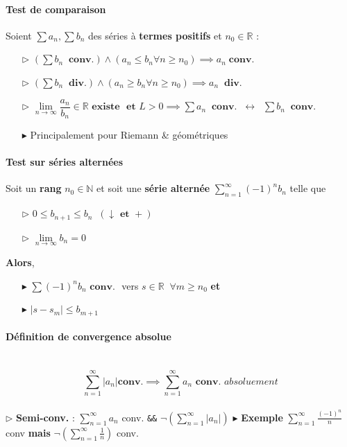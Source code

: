 \documentclass{report}
\begin{document}
\begin{multicols*}{3}
    
     \paragraph{Test de comparaison}
     Soient $\sum a_n, \sum b_n$ des séries à \textbf{termes positifs} 
     et $n_0 \in \mathbb{R}$ :
     \begin{itemize}
         \item[$\rhd$ ] $\left(\sum   b_n  \;\; \textbf{conv.}\right) \land 
             (a_n \leq b_n \forall n \geq n_0) 
             \implies a_n \; \textbf{conv.}$ 
         \item[$\rhd$ ] $\left(\sum   b_n  \;\; \textbf{div.}\right) \land 
             (a_n \geq b_n \forall n \geq n_0) 
             \implies a_n \;\; \textbf{div.}$ 
         \item[$\rhd$ ] $\lim\limits_{n\to\infty}\dfrac{a_n}{b_n}
             \in \mathbb{R} \textbf{ existe } \textbf{ et } L > 0 
             \implies 
        \sum a_n \;\; \textbf{conv.} \;\; \leftrightarrow \;\; 
        \sum b_n \;\; \textbf{conv.}$ 
    \item[$\blacktriangleright$] Principalement pour Riemann \& géométriques
     \end{itemize}

     

     \paragraph{Test sur séries alternées}
     Soit un \textbf{rang} $n_0 \in \mathbb{N}$ et 
     soit une \textbf{série alternée} 
     $\sum_{n=1}^{\infty } (-1)^nb_n$ telle que 
     \begin{itemize}
       \item [$\rhd$ ]  $0 \leq b_{n+1} \leq b_n \;\;(\downarrow \textbf{ et } +)$ 
       \item [$\rhd$ ] $\lim\limits_{n\to\infty }b_n = 0$ 
     \end{itemize}
     \textbf{Alors}, 
     \begin{itemize}
         \item[$\blacktriangleright$]
     $\sum  (-1)^nb_n \textbf{ conv. }$ vers $s \in
     \mathbb{R} \;\; \forall 
     m \geq n_0 $ \textbf{et}  
        \item[$\blacktriangleright$] 
    $|s - s_m| \leq b_{m+1}$
     \end{itemize}

  \paragraph{Définition de convergence absolue}
     \mbox{}\\
     \[ \sum_{n=1}^{\infty }|a_n| \textbf{conv.} \implies \sum_{n=1}^{\infty }a_n  
     \textbf{ conv. } \textit{absoluement} \]
      \\
      $\rhd$  \textbf{Semi-conv.} : $\sum_{n=1}^{\infty }a_n$ conv. 
         \texttt{\&\&} $\neg(\sum_{n=1}^{\infty }|a_n|)$ 
      $\blacktriangleright$  \textbf{Exemple} $\sum_{n=1}^{\infty }\frac{(-1)^n}{n}$ conv 
          \textbf{mais} $\neg(\sum_{n=1}^{\infty }\frac{1}{n})$ conv.  


\end{multicols*}
\end{document}
